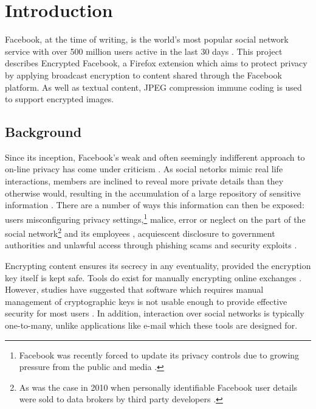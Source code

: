 \chapter{Introduction}\label{ch:introduction}

Facebook, at the time of writing, is the world's most popular social network service with over 500 million users active in the last 30 days \cite{fb-factsheet}. This project describes Encrypted Facebook, a Firefox extension which aims to protect privacy by applying broadcast encryption to content shared through the Facebook platform. As well as textual content, JPEG compression immune coding is used to support encrypted images.

\section{Background}
\label{sec:background}

Since its inception, Facebook's weak and often seemingly indifferent approach to on-line privacy has come under criticism \cite{fb-cipc}. As social netorks mimic real life interactions, members are inclined to reveal more private details than they otherwise would, resulting in the accumulation of a large repository of sensitive information \cite{gross}. There are a number of ways this information can then be exposed: users misconfiguring privacy settings,\footnote{Facebook was recently forced to update its privacy controls due to growing pressure from the public and media \cite{fb-priv}.} malice, error or neglect on the part of the social network\footnote{As was the case in 2010 when personally identifiable Facebook user details were sold to data brokers by third party developers \cite{fb-ids}.} and its employees \cite{snoop}, acquiescent disclosure to government authorities \cite{fb-gov} and unlawful access through phishing scams \cite{fb-phish} and security exploits \cite{rockyou}.

Encrypting content ensures its secrecy in any eventuality, provided the encryption key itself is kept safe. Tools do exist for manually encrypting online exchanges \cite{firegpg}. However, studies have suggested that software which requires manual management of cryptographic keys is not usable enough to provide effective security for most users \cite{johnny}. In addition, interaction over social networks is typically one-to-many, unlike applications like e-mail which these tools are designed for.

